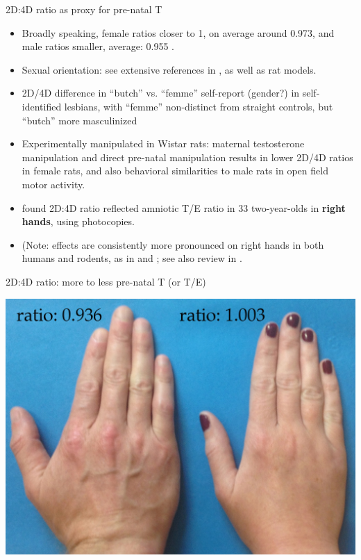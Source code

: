 \documentclass[hyperref={pdfpagelabels=false}]{beamer}
\begin{document}
\begin{frame}{2D:4D ratio as proxy for pre-natal T}
\begin{itemize}
	\item Broadly speaking, female ratios closer to 1, on average around 0.973, and male ratios smaller, average: 0.955 \citep[][107]{balthazart2011}.
	
	\item Sexual orientation: see extensive references in \citet{balthazart2011}, as well as rat models.
	\item 2D/4D difference in ``butch'' vs. ``femme'' self-report (gender?) in self-identified lesbians, with ``femme'' non-distinct from straight controls, but ``butch'' more masculinized \citep{brownetal2002}
	\item Experimentally manipulated in Wistar rats: maternal testosterone manipulation and direct pre-natal manipulation results in lower 2D/4D ratios in female rats, and also behavioral similarities to male rats in open field motor activity\citep{talarovicovaetal2009}.
	\item \citet{lutchmayaetal2004} found 2D:4D ratio reflected amniotic T/E ratio in 33 two-year-olds in \textbf{right hands}, using photocopies.
	\item (Note: effects are consistently more pronounced on right hands in both humans and rodents, as in \citet{brownetal2002} and \citet{talarovicovaetal2009}; see also review in \citet{cohenbendahanetal2005}.
\end{itemize}

\end{frame}

\begin{frame}{2D:4D ratio: more to less pre-natal T (or T/E)}
\begin{center}
	\includegraphics[width=1.12\textwidth]{figures/realhands2.jpg}
\end{center}
\end{frame}
\end{document}
